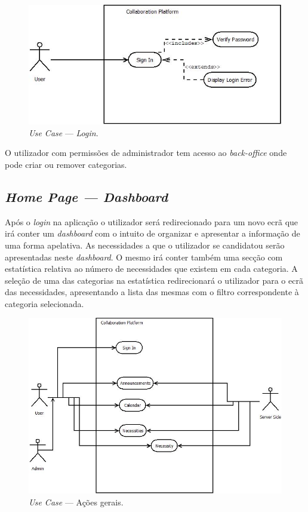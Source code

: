 \begin{figure}[H]
    \centering
    \includegraphics[scale=0.6]{figures/Login Use Case.jpeg}
    \caption{\textit{Use Case} --- \textit{Login}.}\label{fig:uc:login}
\end{figure}

O utilizador com permissões de administrador tem acesso ao \textit{back-office} onde pode criar ou remover categorias.

\subsection{\textit{Home Page --- Dashboard}}\label{subsec:dashboard}

Após o \textit{login} na aplicação o utilizador será redirecionado para um novo ecrã que irá conter um \textit{dashboard} com o intuito de organizar e 
apresentar a informação de uma forma apelativa. As necessidades a que o utilizador se candidatou serão apresentadas neste \textit{dashboard}. 
O mesmo irá conter também uma secção com estatística relativa ao número de necessidades que existem em cada categoria. 
A seleção de uma das categorias na estatística redirecionará o utilizador para o ecrã das necessidades, 
apresentando a lista das mesmas com o filtro correspondente à categoria selecionada. 

\begin{figure}[H]
    \centering
    \includegraphics[scale=0.6]{figures/General Actions.jpeg}
    \caption{\textit{Use Case} --- Ações gerais.}\label{fig:uc:generalactions}
\end{figure}


